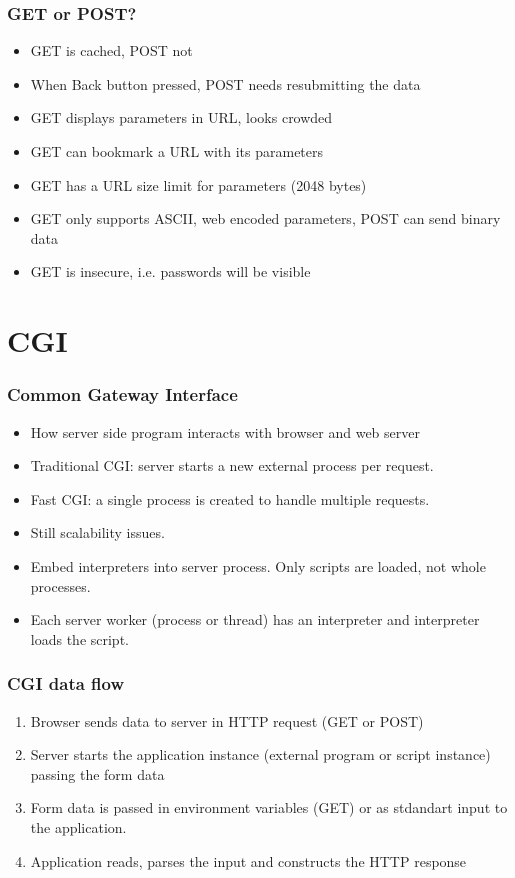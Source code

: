 \documentclass[trans,compress,xcolor=table]{beamer}
\begin{document}
\begin{frame}
\frametitle{GET or POST?}
\begin{itemize}
\item GET is cached, POST not
\item When Back button pressed, POST needs resubmitting the data
\item GET displays parameters in URL, looks crowded
\item GET can bookmark a URL with its parameters
\item GET has a URL size limit for parameters (2048 bytes)
\item GET only supports ASCII, web encoded parameters, POST can send binary data
\item GET is insecure, i.e. passwords will be visible
\end{itemize}
\end{frame}

\section{CGI}
\begin{frame}
\frametitle{Common Gateway Interface}
\begin{itemize}
\item How server side program interacts with browser and web server
\item Traditional CGI: server starts a new external process per
	request.
\item Fast CGI: a single process is created to handle multiple
	requests.
\item Still scalability issues.
\item Embed interpreters into server process. Only scripts are loaded,
	not whole processes. 
\item Each server worker (process or thread) has an interpreter and
	interpreter loads the script.
\end{itemize}
\end{frame}

\begin{frame}
\frametitle{CGI data flow}
\begin{enumerate}
\item Browser sends data to server in HTTP request (GET or POST)
\item Server starts the application instance (external program or
	script instance) passing the form data
\item Form data is passed in environment variables (GET) or as
	stdandart input to the application.
\item Application reads, parses the input and constructs the HTTP
	response
\end{enumerate}
\end{frame}
\end{document}
